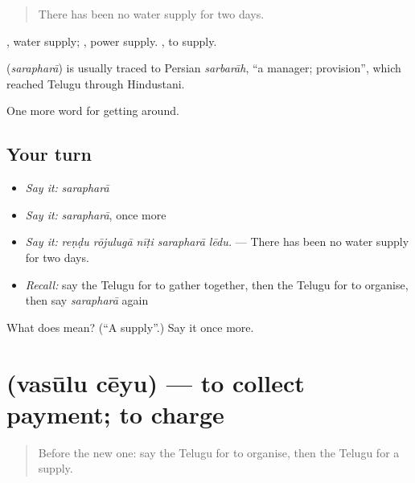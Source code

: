 \begin{quote}
There has been no water supply for two days.
\end{quote}

 , water supply;  , power supply.  , to supply.

\begin{cousinweb}
\textbf{} (\emph{sarapharā}) is usually traced to Persian \emph{sarbarāh}, \textquotedblleft{}a manager; provision\textquotedblright{}, which reached Telugu through Hindustani.
\end{cousinweb}

\begin{grammarlens}[title={What you've built}]
One more word for getting around.
\end{grammarlens}

\subsection*{Your turn}
\begin{itemize}
\raggedright
  \item \emph{Say it:} \emph{sarapharā}
  \item \emph{Say it:} \emph{sarapharā}, once more
  \item \emph{Say it:} \emph{reṇḍu rōjulugā nīṭi sarapharā lēdu.} — There has been no water supply for two days.
  \item \emph{Recall:} say the Telugu for to gather together, then the Telugu for to organise, then say \emph{sarapharā} again
\end{itemize}

\begin{tcolorbox}[breakable,colback=teal!4,colframe=teal!35!black,title={Before you move on}]
What does  mean? (\textquotedblleft{}A supply\textquotedblright{}.) Say it once more.
\end{tcolorbox}
\section[\texorpdfstring{\te{వసూలు} \te{చేయు} (vasūlu cēyu)}{వసూలు చేయు (vasūlu cēyu)}]{  (vasūlu cēyu) — to collect payment; to charge}

\label{lesson:TE-C464-vasulu-ceyu}



\begin{quote}
Before the new one: say the Telugu for to organise, then the Telugu for a supply.
\end{quote}

